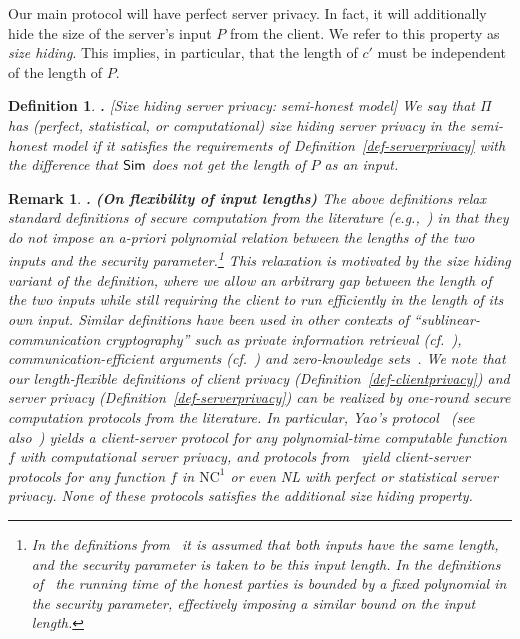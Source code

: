 \documentclass[11pt]{article}
\newcommand{\ynote}[1]{}
\newcommand{\full}[1]{#1}
\newcommand{\nc}[1]{{\mathrm{NC}^{#1}}}
\newcommand{\NCone}{{\nc{1}}}
\renewcommand{\sim}{{\sf Sim}}
\newtheorem{REMARK}{Remark}[section]
\newenvironment{remark}{\begin{REMARK} \hspace{-.85em} {\bf .} \rm}%
	{\end{REMARK}}
\newtheorem{DEFINITION}{Definition}[section]
\newenvironment{definition}{\begin{DEFINITION} \hspace{-.85em} {\bf .} \rm}%
	{\end{DEFINITION}}
\begin{document}
Our main protocol will have perfect server privacy. In fact, it will
additionally hide the size of the server's input $P$ from the
client.  We refer to this property as {\em size hiding}. This
implies, in particular, that the length of $c'$ must be independent
of the length of $P$.

\begin{definition}[Size hiding server privacy: semi-honest model]
\label{def-sizehiding} We say that $\Pi$ has (perfect, statistical,
or computational) {\em size hiding server privacy} in the
semi-honest model if it satisfies the requirements of
Definition~\ref{def-serverprivacy} with the difference that
$\sim$ does not get the length of $P$ as an input.
\end{definition}

\full{
\begin{remark}{\bf (On flexibility of input lengths)}
The above definitions relax standard definitions of secure
computation from the literature (e.g.,~\cite{canetti01,Goldbook}) in that
they do not impose an a-priori polynomial relation between the
lengths of the two inputs and the security parameter.\footnote{In
the definitions from~\cite{Goldbook} it is assumed that both inputs
have the same length, and the security parameter is taken to be
this input length. In the definitions of~\cite{canetti01} the running
time of the honest parties is bounded by a fixed polynomial in the
security parameter, effectively imposing a similar bound on the
input length.} This relaxation is motivated by the size hiding
variant of the definition, where we allow an arbitrary gap between
the length of the two inputs while still requiring the client to
run efficiently in the length of its own input. Similar definitions
have been used in other contexts of ``sublinear-communication
cryptography'' such as private information retrieval
(cf.~\cite{L04}), communication-efficient arguments (cf.~\cite{BG})
and zero-knowledge sets~\cite{MRK}.\ynote{should check how similar
these definitions are...} We note that our length-flexible
definitions of client privacy (Definition~\ref{def-clientprivacy})
and server privacy (Definition~\ref{def-serverprivacy}) can be
realized by one-round secure computation protocols from the
literature. In particular, Yao's protocol~\cite{yao86} (see
also~\cite{FKN94,L04}) yields a client-server protocol for any
polynomial-time computable function $f$ with computational server
privacy, and protocols from~\cite{syy99,K,FKN94,ik00,beaver00,Kol}
yield client-server protocols for any function $f$ in $\NCone$ or
even NL with perfect or statistical server privacy. None of these
protocols satisfies the additional size hiding property.
\end{remark}
}
\end{document}
